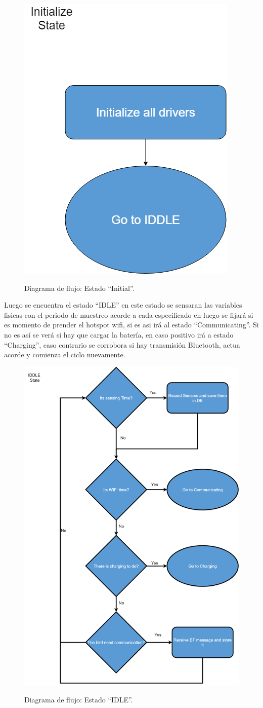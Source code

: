 \begin{figure}[H]
	\centering
	\includegraphics[width=0.4\linewidth]{ImagenesIngenieria de Detalle/diagrama_flujo_initial}
	\label{fig:Diagrama_de_flujo_init}
	\caption{Diagrama de flujo: Estado ``Initial''.}
\end{figure}
Luego se encuentra el estado ``IDLE'' en este estado se sensaran las variables fisicas con el periodo de muestreo acorde a cada especificado en 
luego se fijará si es momento de prender el hotspot wifi, si es asi irá al estado ``Communicating''. Si no es as\'i se ver\'a si hay que cargar la bater\'ia, en caso positivo ir\'a a estado ``Charging'', caso contrario se corrobora si hay transmisi\'on Bluetooth, actua acorde  y comienza el ciclo nuevamente.
\begin{figure}[H]
	\centering
	\includegraphics[width=0.9\linewidth]{ImagenesIngenieria de Detalle/diagrama_flujo_idle}
	\label{fig:Diagrama_de_flujo_idle}
	\caption{Diagrama de flujo: Estado ``IDLE''.}
\end{figure}

